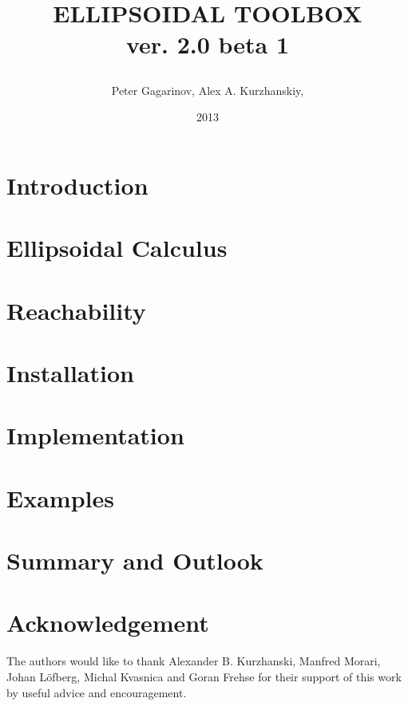 \documentclass{report}
\title{
\easyfigure[ht][0.7\textwidth]{logo.eps}{}{}
ELLIPSOIDAL TOOLBOX%
\\
\normalsize{ver. 2.0 beta 1}
\author{Peter Gagarinov, Alex A. Kurzhanskiy,}
\date{2013}
}
\begin{document}
\maketitle
\tableofcontents

\chapter{Introduction}\label{ch_intro}


\chapter{Ellipsoidal Calculus}\label{ch_ellcalc}


\chapter{Reachability}\label{ch_reachability}


\chapter{Installation}\label{ch_install}


\chapter{Implementation}\label{ch_implementation}


\chapter{Examples}\label{ch_examples}


\chapter{Summary and Outlook}\label{ch_summary}


\chapter*{Acknowledgement}
The authors would like to thank Alexander B. Kurzhanski,
Manfred Morari, Johan L{\"o}fberg, Michal Kvasnica and Goran Frehse
for their support of this work by useful advice and encouragement.
\end{document}
